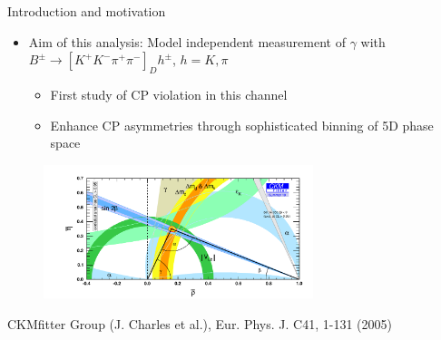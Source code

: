 \documentclass{beamer}
\begin{document}
\begin{frame}{Introduction and motivation}
  \begin{itemize}
    \setlength\itemsep{1.2em}
    \item{Aim of this analysis: Model independent measurement of $\gamma$ with $B^\pm\to[K^+K^-\pi^+\pi^-]_D h^\pm$, $h = K, \pi$}
    \begin{itemize}
      \item{First study of CP violation in this channel}
      \item{Enhance CP asymmetries through sophisticated binning of 5D phase space}
    \end{itemize}
  \end{itemize}
  \vspace{-0.2cm}
  \begin{figure}
    \includegraphics[width = 0.70\textwidth]{Plots/ckmfitter2.pdf}
  \end{figure}
  \vspace{-0.5cm}
  \begin{center}
    \tiny{CKMfitter Group (J. Charles et al.), Eur. Phys. J. C41, 1-131 (2005)}
  \end{center}
\end{frame}
\end{document}
